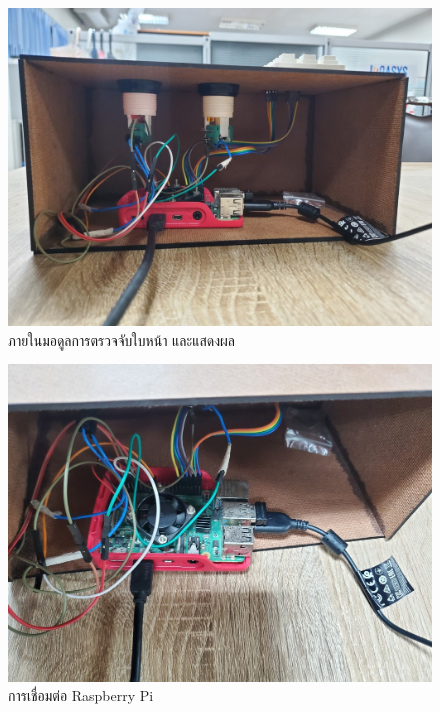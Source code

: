 \begin{figure}[!ht]
  \begin{center}
    \includegraphics[scale=.17]{pic/rpi_back.jpg}
    \caption[ภายในมอดูลการตรวจจับใบหน้า และแสดงผล]{ภายในมอดูลการตรวจจับใบหน้า และแสดงผล}
    \label{fig:inside_module}
  \end{center}
\end{figure}

\begin{figure}[!ht]
  \begin{center}
    \includegraphics[scale=.17]{pic/rpi.jpg}
    \caption[การเชื่อมต่อ Raspberry Pi]{การเชื่อมต่อ Raspberry Pi}
    \label{fig:rpi_module}
  \end{center}
\end{figure}

